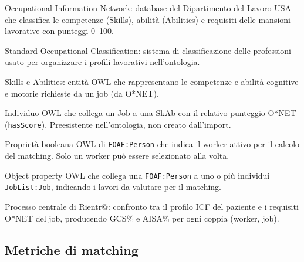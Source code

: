 \documentclass[a4paper,12pt]{article}
\begin{document}
\begin{description}[leftmargin=4cm, labelwidth=3.8cm, labelsep=0.2cm]
\item[\textbf{O*NET}]
  Occupational Information Network: database del Dipartimento del Lavoro
  USA che classifica le competenze (Skills), abilit\`{a} (Abilities) e
  requisiti delle mansioni lavorative con punteggi 0--100.

\item[\textbf{SOC}]
  Standard Occupational Classification: sistema di classificazione
  delle professioni usato per organizzare i profili lavorativi nell'ontologia.

\item[\textbf{SkAb}]
  Skills e Abilities: entit\`{a} OWL che rappresentano le competenze e
  abilit\`{a} cognitive e motorie richieste da un job (da O*NET).

\item[\textbf{Job\_Descriptor}]
  Individuo OWL che collega un Job a una SkAb con il relativo punteggio
  O*NET (\texttt{hasScore}). Preesistente nell'ontologia, non creato dall'import.

\item[\textbf{isSelected}]
  Propriet\`{a} booleana OWL di \texttt{FOAF:Person} che indica il worker
  attivo per il calcolo del matching. Solo un worker pu\`{o} essere
  selezionato alla volta.

\item[\textbf{isEvaluatedForJob}]
  Object property OWL che collega una \texttt{FOAF:Person} a uno o pi\`{u}
  individui \texttt{JobList:Job}, indicando i lavori da valutare per il matching.

\item[\textbf{Matching}]
  Processo centrale di Rientr@: confronto tra il profilo ICF del paziente
  e i requisiti O*NET del job, producendo GCS\% e AISA\% per ogni coppia
  (worker, job).

\end{description}

\subsection*{Metriche di matching}
\end{document}

